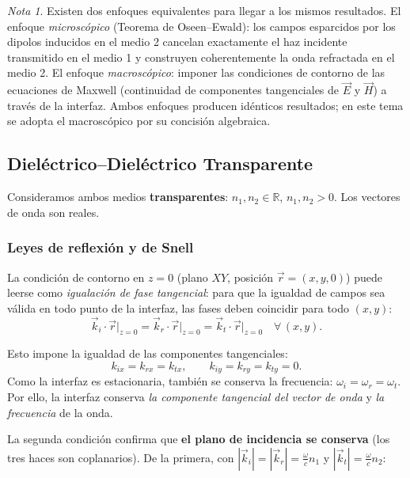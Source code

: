 \documentclass[12pt, a4paper]{article}
\theoremstyle{plain}
\theoremstyle{definition}
\theoremstyle{remark}
\newtheorem*{nota}{Nota}
\newcommand{\R}{\mathbb{R}}
\newcommand{\ve}[1]{\vec{#1}}
\begin{document}
\begin{nota}
Existen dos enfoques equivalentes para llegar a los mismos resultados.
El enfoque \emph{microscópico} (Teorema de Oseen--Ewald): los campos esparcidos
por los dipolos inducidos en el medio 2 cancelan exactamente el haz incidente
transmitido en el medio 1 y construyen coherentemente la onda refractada en el
medio 2. El enfoque \emph{macroscópico}: imponer las condiciones de contorno de
las ecuaciones de Maxwell (continuidad de componentes tangenciales de $\ve{E}$
y $\ve{H}$) a través de la interfaz. Ambos enfoques producen idénticos
resultados; en este tema se adopta el macroscópico por su concisión algebraica.
\end{nota}

\subsection{Dieléctrico--Dieléctrico Transparente}

Consideramos ambos medios \textbf{transparentes}: $n_1, n_2 \in \R$,
$n_1, n_2 > 0$. Los vectores de onda son reales.

\subsubsection{Leyes de reflexión y de Snell}

La condición de contorno en $z = 0$ (plano $XY$, posición $\ve{r} = (x,y,0)$)
puede leerse como \emph{igualación de fase tangencial}: para que la igualdad
de campos sea válida en todo punto de la interfaz, las fases deben coincidir
para todo $(x,y)$:
\[
  \ve{k}_i \cdot \ve{r}\big|_{z=0}
  = \ve{k}_r \cdot \ve{r}\big|_{z=0}
  = \ve{k}_t \cdot \ve{r}\big|_{z=0}
  \quad \forall\, (x,y).
\]

Esto impone la igualdad de las componentes tangenciales:
\[
  k_{ix} = k_{rx} = k_{tx}, \qquad k_{iy} = k_{ry} = k_{ty} = 0.
\]
Como la interfaz es estacionaria, también se conserva la frecuencia:
$\omega_i=\omega_r=\omega_t$. Por ello, la interfaz conserva \emph{la
componente tangencial del vector de onda} y \emph{la frecuencia} de la onda.

La segunda condición confirma que \textbf{el plano de incidencia se conserva}
(los tres haces son coplanarios). De la primera, con
$|\ve{k}_i| = |\ve{k}_r| = \frac{\omega}{c}n_1$ y
$|\ve{k}_t| = \frac{\omega}{c}n_2$:
\end{document}
